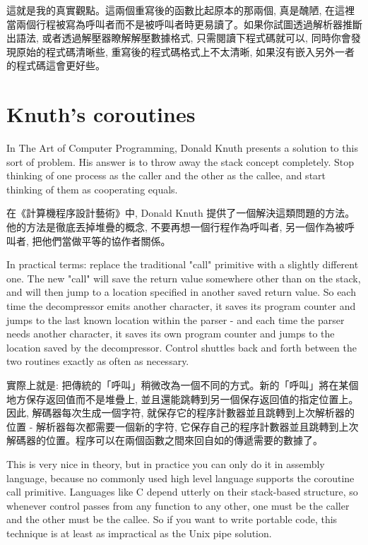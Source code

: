 \documentclass[12pt]{article}
\begin{document}
\begin{CJK}{UTF8}{bsmi}
這就是我的真實觀點。這兩個重寫後的函數比起原本的那兩個, 真是醜陋, 在這裡當兩個行程被寫為呼叫者而不是被呼叫者時更易讀了。如果你試圖透過解析器推斷出語法, 或者透過解壓器瞭解解壓數據格式, 只需閱讀下程式碼就可以, 同時你會發現原始的程式碼清晰些, 重寫後的程式碼格式上不太清晰, 如果沒有嵌入另外一者的程式碼這會更好些。 

\section{Knuth's coroutines}
 In The Art of Computer Programming, Donald Knuth presents a solution to this sort of problem. His answer is to throw away the stack concept completely. Stop thinking of one process as the caller and the other as the callee, and start thinking of them as cooperating equals.

在《計算機程序設計藝術》中, Donald Knuth 提供了一個解決這類問題的方法。他的方法是徹底丟掉堆疊的概念, 不要再想一個行程作為呼叫者, 另一個作為被呼叫者, 把他們當做平等的協作者關係。

 In practical terms: replace the traditional "call" primitive with a slightly different one. The new "call" will save the return value somewhere other than on the stack, and will then jump to a location specified in another saved return value. So each time the decompressor emits another character, it saves its program counter and jumps to the last known location within the parser - and each time the parser needs another character, it saves its own program counter and jumps to the location saved by the decompressor. Control shuttles back and forth between the two routines exactly as often as necessary.

實際上就是: 把傳統的「呼叫」稍微改為一個不同的方式。新的「呼叫」將在某個地方保存返回值而不是堆疊上, 並且還能跳轉到另一個保存返回值的指定位置上。因此, 解碼器每次生成一個字符, 就保存它的程序計數器並且跳轉到上次解析器的位置 - 解析器每次都需要一個新的字符, 它保存自己的程序計數器並且跳轉到上次解碼器的位置。程序可以在兩個函數之間來回自如的傳遞需要的數據了。

 This is very nice in theory, but in practice you can only do it in assembly language, because no commonly used high level language supports the coroutine call primitive. Languages like C depend utterly on their stack-based structure, so whenever control passes from any function to any other, one must be the caller and the other must be the callee. So if you want to write portable code, this technique is at least as impractical as the Unix pipe solution.


\end{CJK}
\end{document}
